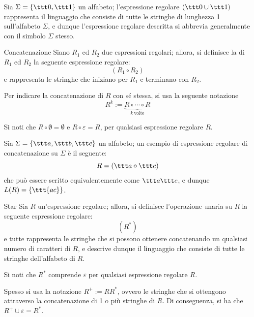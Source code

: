\documentclass[a4paper, 12pt]{report}
\begin{document}
    \begin{example}
        Sia $\Sigma = \{\ttt 0, \ttt 1\}$ un alfabeto; l'espressione regolare $(\ttt 0 \cup \ttt 1)$ rappresenta il linguaggio che consiste di tutte le stringhe di lunghezza 1 sull'alfabeto $\Sigma$, e dunque l'espressione regolare descritta si abbrevia generalmente con il simbolo $\Sigma$ stesso.
    \end{example}

    \begin{frameddefn}{Concatenazione}
        Siano $R_1$ ed $R_2$ due espressioni regolari; allora, si definisce la  di $R_1$ ed $R_2$ la seguente espressione regolare: $$(R_1 \circ R_2)$$ e rappresenta le stringhe che iniziano per $R_1$ e terminano con $R_2$.

        Per indicare la concatenazione di $R$ con sé stessa, si usa la seguente notazione $$R^k := \underbrace{R \circ \cdots \circ R}_{k \ \textrm{volte}}$$

        Si noti che $R \circ \emptyset = \emptyset$ e $R \circ \varepsilon = R$, per qualsiasi espressione regolare $R$.
    \end{frameddefn}

    \begin{example}[Concatenazione]
        Sia $\Sigma = \{\ttt a, \ttt b, \ttt c\}$ un alfabeto; un esempio di espressione regolare di concatenazione su $\Sigma$ è il seguente: $$R = (\ttt a \circ \ttt c)$$ che può essere scritto equivalentemente come $\ttt a \ttt c$, e dunque $L(R) = \{ \ttt{ac} \}$.
    \end{example}

    \begin{frameddefn}{Star}
        Sia $R$ un'espressione regolare; allora, si definisce l'operazione unaria  su $R$ la seguente espressione regolare: $$(R^*)$$ e tutte rappresenta le stringhe che si possono ottenere concatenando un qualsiasi numero di caratteri di $R$, e descrive dunque il linguaggio che consiste di tutte le stringhe dell'alfabeto di $R$.

        Si noti che $R^*$ comprende $\varepsilon$ per qualsiasi espressione regolare $R$.

        Spesso si usa la notazione $R^+ := RR^*$, ovvero le stringhe che si ottengono attraverso la concatenazione di 1 o più stringhe di $R$. Di conseguenza, si ha che $R^+ \cup \varepsilon = R^*$.
    \end{frameddefn}
\end{document}

